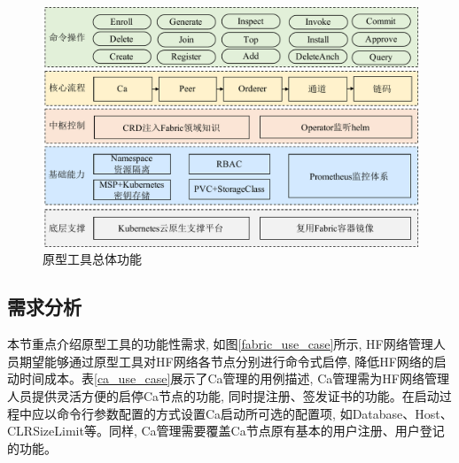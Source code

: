 \begin{figure}[!htbp] %
    \centering %
    \includegraphics[width=1.0\textwidth]{FIGs/chapter4/tool.pdf} %
    \caption{原型工具总体功能} %
    \label{toolstotal} %
\end{figure}%

\subsection{需求分析} \label{section: requirement}

本节重点介绍原型工具的功能性需求, 如图\ref{fabric_use_case}所示, HF网络管理人员期望能够通过原型工具对HF网络各节点分别进行命令式启停, 降低HF网络的启动时间成本。表\ref{ca_use_case}展示了Ca管理的用例描述, Ca管理需为HF网络管理人员提供灵活方便的启停Ca节点的功能, 同时提注册、签发证书的功能。在启动过程中应以命令行参数配置的方式设置Ca启动所可选的配置项, 如Database、Host、CLRSizeLimit等。同样, Ca管理需要覆盖Ca节点原有基本的用户注册、用户登记的功能。

